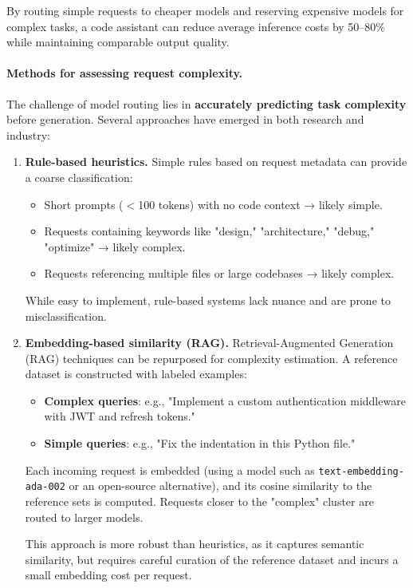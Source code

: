 \documentclass[english]{article}
\begin{document}
By routing simple requests to cheaper models and reserving expensive models for complex tasks, a code assistant can reduce average inference costs by 50--80\% while maintaining comparable output quality.

\paragraph{Methods for assessing request complexity.}

The challenge of model routing lies in \textbf{accurately predicting task complexity} before generation. Several approaches have emerged in both research and industry:

\begin{enumerate}
    \item \textbf{Rule-based heuristics.} Simple rules based on request metadata can provide a coarse classification:
    \begin{itemize}
        \item Short prompts ($<$100 tokens) with no code context → likely simple.
        \item Requests containing keywords like "design," "architecture," "debug," "optimize" → likely complex.
        \item Requests referencing multiple files or large codebases → likely complex.
    \end{itemize}
    While easy to implement, rule-based systems lack nuance and are prone to misclassification.

    \item \textbf{Embedding-based similarity (RAG).} Retrieval-Augmented Generation (RAG) techniques can be repurposed for complexity estimation. A reference dataset is constructed with labeled examples:
    \begin{itemize}
        \item \textbf{Complex queries}: e.g., "Implement a custom authentication middleware with JWT and refresh tokens."
        \item \textbf{Simple queries}: e.g., "Fix the indentation in this Python file."
    \end{itemize}
    Each incoming request is embedded (using a model such as \texttt{text-embedding-ada-002} or an open-source alternative), and its cosine similarity to the reference sets is computed. Requests closer to the "complex" cluster are routed to larger models.

    This approach is more robust than heuristics, as it captures semantic similarity, but requires careful curation of the reference dataset and incurs a small embedding cost per request.


\end{enumerate}
\end{document}
